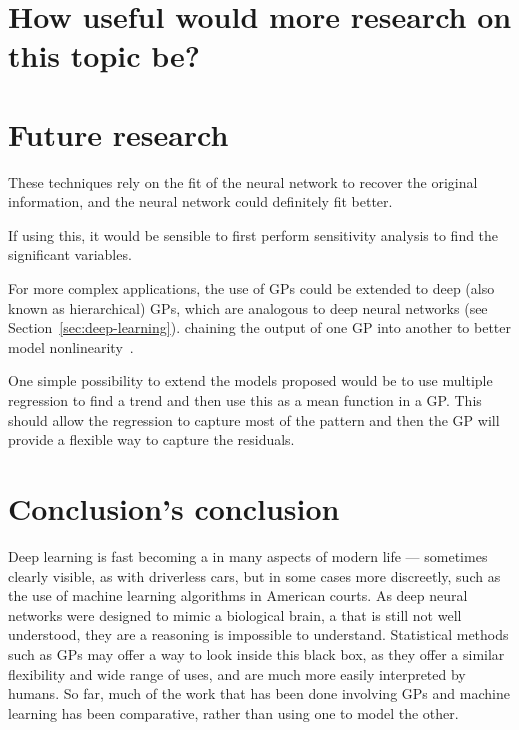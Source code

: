 \section{How useful would more research on this topic be?}

\section{Future research}

These techniques rely on the fit of the neural network to recover the original information, and the neural network could definitely fit better.

If using this, it would be sensible to first perform sensitivity analysis to find the significant variables.

For more complex applications, the use of \acp{GP} could be extended to deep (also known as hierarchical) \acp{GP}, which are analogous to deep neural networks (see Section~\ref{sec:deep-learning}).
 chaining the output of one \ac{GP} into another to better model nonlinearity~\autocite{damianou2013}.

One simple possibility to extend the models proposed would be to use multiple regression to find a trend and then use this as a mean function in a \ac{GP}.
This should allow the regression to capture most of the pattern and then the \ac{GP} will provide a flexible way to capture the residuals.

\section{Conclusion's conclusion}

Deep learning is fast becoming a  in many aspects of modern life --- sometimes clearly visible, as with driverless cars, but in some cases more discreetly, such as the use of machine learning algorithms in American courts.
As deep neural networks were designed to mimic a biological brain, a  that is still not well understood, they are a   reasoning is impossible to understand.
Statistical methods such as \acp{GP} may offer a way to look inside this black box, as they offer a similar flexibility and wide range of uses, and are much more easily interpreted by humans.
So far, much of the work that has been done involving \acp{GP} and machine learning has been comparative, rather than using one to model the other.
